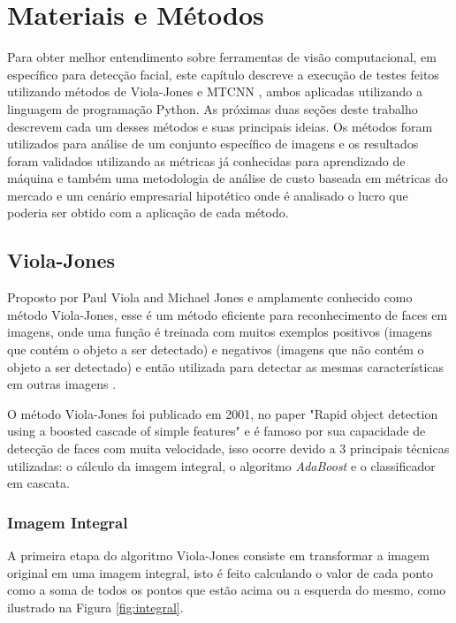 \chapter{Materiais e Métodos}\label{cap:ferramentas}

Para obter melhor entendimento sobre ferramentas de visão computacional, em específico para detecção facial, este capítulo descreve a execução de testes feitos utilizando métodos de Viola-Jones \cite{paper-viola-jones} e MTCNN \cite{mtcnn}, ambos aplicadas utilizando a linguagem de programação Python. As próximas duas seções deste trabalho descrevem cada um desses métodos e suas principais ideias.
Os métodos foram utilizados para análise de um conjunto específico de imagens e os resultados foram validados utilizando as métricas já conhecidas para aprendizado de máquina e também uma metodologia de análise de custo baseada em métricas do mercado e um cenário empresarial hipotético onde é analisado o lucro que poderia ser obtido com a aplicação de cada método.

\section{Viola-Jones}

Proposto por Paul Viola and Michael Jones e amplamente conhecido como método Viola-Jones, esse é um método eficiente para reconhecimento de faces em imagens, onde uma função é treinada com muitos exemplos positivos (imagens que contém o objeto a ser detectado) e negativos (imagens que não contém o objeto a ser detectado) e então utilizada para detectar as mesmas características em outras imagens \cite{itseez2014theopencv}.

O método Viola-Jones foi publicado em 2001, no paper "Rapid object detection using a boosted cascade of simple features" \cite{paper-viola-jones} e é famoso por sua capacidade de detecção de faces com muita velocidade, isso ocorre devido a 3 principais técnicas utilizadas: o cálculo da imagem integral, o algoritmo \textit{AdaBoost} e o classificador em cascata.

\subsection{Imagem Integral}

A primeira etapa do algoritmo Viola-Jones consiste em transformar a imagem original em uma imagem integral, isto é feito calculando o valor de cada ponto como a soma de todos os pontos que estão acima ou a esquerda do mesmo, como ilustrado na Figura \ref{fig:integral}.

